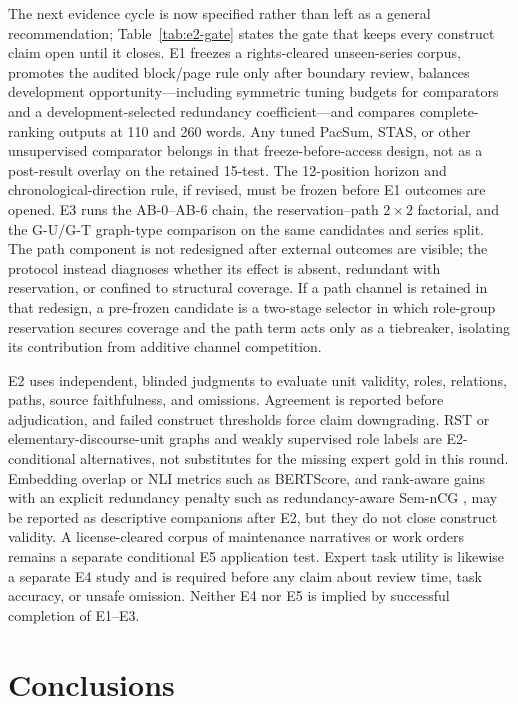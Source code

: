 \documentclass[information,article,submit,moreauthors]{Definitions/mdpi}
\begin{document}
The next evidence cycle is now specified rather than left as a general recommendation; Table~\ref{tab:e2-gate} states the gate that keeps every construct claim open until it closes. E1 freezes a rights-cleared unseen-series corpus, promotes the audited block/page rule only after boundary review, balances development opportunity---including symmetric tuning budgets for comparators and a development-selected redundancy coefficient---and compares complete-ranking outputs at 110 and 260 words. Any tuned PacSum, STAS, or other unsupervised comparator belongs in that freeze-before-access design, not as a post-result overlay on the retained 15-test. The 12-position horizon and chronological-direction rule, if revised, must be frozen before E1 outcomes are opened. E3 runs the AB-0--AB-6 chain, the reservation--path $2\times2$ factorial, and the G-U/G-T graph-type comparison on the same candidates and series split. The path component is not redesigned after external outcomes are visible; the protocol instead diagnoses whether its effect is absent, redundant with reservation, or confined to structural coverage. If a path channel is retained in that redesign, a pre-frozen candidate is a two-stage selector in which role-group reservation secures coverage and the path term acts only as a tiebreaker, isolating its contribution from additive channel competition.

E2 uses independent, blinded judgments to evaluate unit validity, roles, relations, paths, source faithfulness, and omissions. Agreement is reported before adjudication, and failed construct thresholds force claim downgrading. RST or elementary-discourse-unit graphs and weakly supervised role labels are E2-conditional alternatives, not substitutes for the missing expert gold in this round. Embedding overlap or NLI metrics such as BERTScore, and rank-aware gains with an explicit redundancy penalty such as redundancy-aware Sem-nCG \cite{akter2024semncg}, may be reported as descriptive companions after E2, but they do not close construct validity. A license-cleared corpus of maintenance narratives or work orders remains a separate conditional E5 application test. Expert task utility is likewise a separate E4 study and is required before any claim about review time, task accuracy, or unsafe omission. Neither E4 nor E5 is implied by successful completion of E1--E3.

\section{Conclusions}
\end{document}
